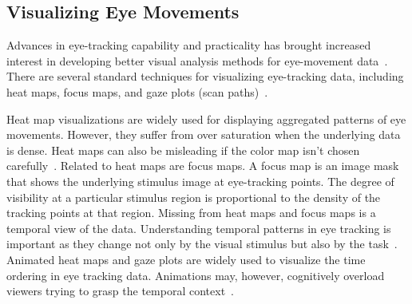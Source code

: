\documentclass{sigchi}
\begin{document}
\subsection{Visualizing Eye Movements} Advances in eye-tracking capability
and practicality has brought increased interest in developing better visual
analysis methods for eye-movement data~\cite{Blascheck_2014}. There are
several standard techniques for visualizing eye-tracking data, including
heat maps, focus maps, and gaze plots (scan paths)~\cite{Holmqvist_2011}. 

Heat map visualizations are widely used for displaying aggregated patterns
of eye movements. However, they suffer from over saturation when the
underlying data is dense.  Heat maps can also be misleading if the color
map isn’t chosen carefully~\cite{Borland_2007}. Related to heat maps are
focus maps.  A focus map is an image mask that shows the underlying
stimulus image at eye-tracking points.  The degree of visibility at a
particular stimulus region is proportional to the density of the tracking
points at that region.  Missing from heat maps and focus maps is a temporal
view of the data. Understanding temporal patterns in eye tracking is
important as they change not only by the visual stimulus but also by the
task~\cite{Yarbus_1967}. Animated heat maps and gaze plots are widely used
to visualize the time ordering in eye tracking data. Animations may,
however, cognitively overload viewers trying to grasp the temporal
context~\cite{TVERSKY_2002}. 
\end{document}
